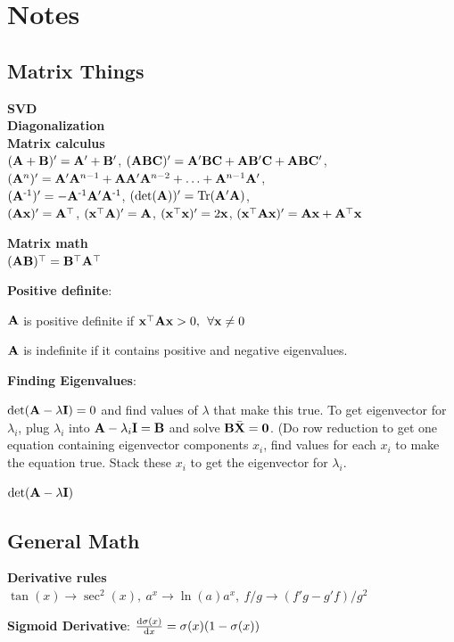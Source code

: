 \section*{Notes}
\subsection*{Matrix Things}
\textbf{SVD}\\
\textbf{Diagonalization}\\
\textbf{Matrix calculus}\\
\tab$(\mathbf A+\mathbf B)'=\mathbf A'+\mathbf B'$, \tab$(\mathbf A\mathbf B\mathbf C)'=\mathbf A'\mathbf B\mathbf C+\mathbf A\mathbf B'\mathbf C+\mathbf A\mathbf B\mathbf C'$,\\
\tab$(\mathbf A^n)'=\mathbf A'\mathbf A^{n-1}+\mathbf A\mathbf A'\mathbf A^{n-2}+\ldots+\mathbf A^{n-1}\mathbf A'$,\\
\tab$(\mathbf A^{\text{-}1})'=-\mathbf A^{\text{-}1}\mathbf A'\mathbf A^{\text{-}1}$, $(\det(\mathbf A))'=\Tr(\mathbf A'\mathbf A)$,\\
\tab$(\mathbf A\mathbf x)'=\mathbf A^{\mathop{\mathrm{\top}}}$, $(\mathbf x^{\mathop{\mathrm{\top}}}\mathbf A)'=\mathbf A$, $(\mathbf x^{\mathop{\mathrm{\top}}}\mathbf x)'=2\mathbf x$, \tab$(\mathbf x^{\mathop{\mathrm{\top}}}\mathbf A\mathbf x)'=\mathbf A\mathbf x+\mathbf A^{\mathop{\mathrm{\top}}}\mathbf x$


\textbf{Matrix math}\\
\tab$(\mathbf A\mathbf B)^{\mathop{\mathrm{\top}}}=\mathbf B^{\mathop{\mathrm{\top}}}\mathbf A^{\mathop{\mathrm{\top}}}$

\textbf{Positive definite}:

\tab$\mathbf A$ is positive definite if $\mathbf x^{\mathop{\mathrm{\top}}}\mathbf A\mathbf x > 0,\>\> \forall \mathbf x\neq0$

\tab$\mathbf A$ is indefinite if it contains positive and negative eigenvalues.

\textbf{Finding Eigenvalues}:

\tab $\det(\mathbf A - \lambda \mathbf I)=0$ and find values of $\lambda$ that make this true. To get eigenvector for $\lambda_i$, plug $\lambda_i$ into $\mathbf A - \lambda_i \mathbf I = \mathbf B$ and solve $\mathbf B\bar{\mathbf X}=\mathbf{0}$. (Do row reduction to get one equation containing eigenvector components $x_i$, find values for each $x_i$ to make the equation true. Stack these $x_i$ to get the eigenvector for $\lambda_i$. 

\tab $\det(\mathbf A - \lambda \mathbf I)$

\subsection*{General Math}
\textbf{Derivative rules}\\
$\tan(x)\xrightarrow{}\sec^2(x),\>a^x\xrightarrow{}\ln(a)a^x,\>f/g\xrightarrow{}(f'g-g'f)/g^2$



\textbf{Sigmoid Derivative}: $\dv{\sigma(x)}{x} = \sigma(x)(1-\sigma(x))$\\

